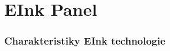 \chapter{EInk Panel}

\subsection{Charakteristiky EInk technologie}
\endinput

\subsection{Možnosti zobrazení a omezení}
\endinput

\subsection{Programování Eink Displaye}

\endinput